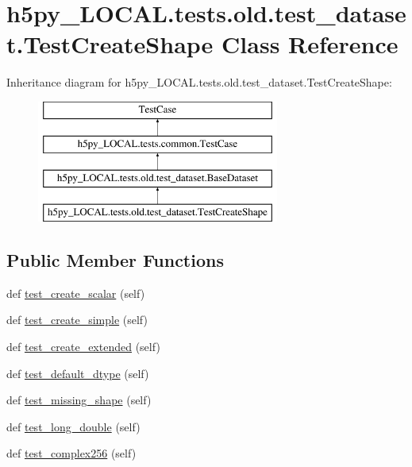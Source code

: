 \hypertarget{classh5py__LOCAL_1_1tests_1_1old_1_1test__dataset_1_1TestCreateShape}{}\section{h5py\+\_\+\+L\+O\+C\+A\+L.\+tests.\+old.\+test\+\_\+dataset.\+Test\+Create\+Shape Class Reference}
\label{classh5py__LOCAL_1_1tests_1_1old_1_1test__dataset_1_1TestCreateShape}
Inheritance diagram for h5py\+\_\+\+L\+O\+C\+A\+L.\+tests.\+old.\+test\+\_\+dataset.\+Test\+Create\+Shape\+:\begin{figure}[H]
\begin{center}
\leavevmode
\includegraphics[height=4.000000cm]{classh5py__LOCAL_1_1tests_1_1old_1_1test__dataset_1_1TestCreateShape}
\end{center}
\end{figure}
\subsection*{Public Member Functions}
\begin{DoxyCompactItemize}
\item 
def \hyperlink{classh5py__LOCAL_1_1tests_1_1old_1_1test__dataset_1_1TestCreateShape_aa935fa41d81b2b43427ff8f1623b4a2a}{test\+\_\+create\+\_\+scalar} (self)
\item 
def \hyperlink{classh5py__LOCAL_1_1tests_1_1old_1_1test__dataset_1_1TestCreateShape_a7dc54ae82a57e85d9f754924f76bace6}{test\+\_\+create\+\_\+simple} (self)
\item 
def \hyperlink{classh5py__LOCAL_1_1tests_1_1old_1_1test__dataset_1_1TestCreateShape_ada7211bb72c23a0c6f0857eacc9929ce}{test\+\_\+create\+\_\+extended} (self)
\item 
def \hyperlink{classh5py__LOCAL_1_1tests_1_1old_1_1test__dataset_1_1TestCreateShape_a821512178e77c599ecb4ed85a6aa2ad8}{test\+\_\+default\+\_\+dtype} (self)
\item 
def \hyperlink{classh5py__LOCAL_1_1tests_1_1old_1_1test__dataset_1_1TestCreateShape_ac28fffdad58d04ea1874fe4ce6a6580f}{test\+\_\+missing\+\_\+shape} (self)
\item 
def \hyperlink{classh5py__LOCAL_1_1tests_1_1old_1_1test__dataset_1_1TestCreateShape_aad4842eb948119bdcf364a83de486e3f}{test\+\_\+long\+\_\+double} (self)
\item 
def \hyperlink{classh5py__LOCAL_1_1tests_1_1old_1_1test__dataset_1_1TestCreateShape_ab849499015f79cec7b67324490647bc5}{test\+\_\+complex256} (self)
\end{DoxyCompactItemize}
